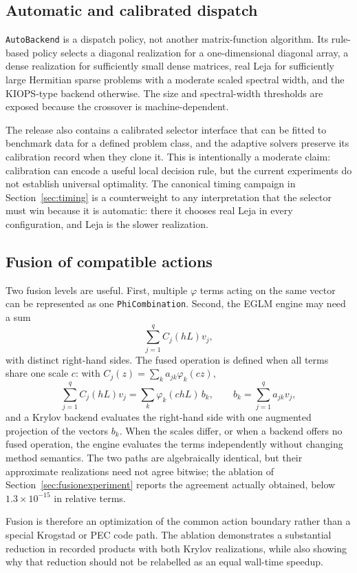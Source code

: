 \subsection{Automatic and calibrated dispatch}

\texttt{AutoBackend} is a dispatch policy, not another matrix-function
algorithm.  Its rule-based policy selects a diagonal realization for a
one-dimensional diagonal array, a dense realization for sufficiently small
dense matrices, real Leja for sufficiently large Hermitian sparse problems with
a moderate scaled spectral width, and the KIOPS-type backend otherwise.  The
size and spectral-width thresholds are exposed because the crossover is
machine-dependent.

The release also contains a calibrated selector interface that can be fitted to
benchmark data for a defined problem class, and the adaptive solvers preserve
its calibration record when they clone it.  This is intentionally a moderate
claim: calibration can encode a useful local decision rule, but the current
experiments do not establish universal optimality.  The canonical timing
campaign in Section~\ref{sec:timing} is a counterweight to any interpretation
that the selector must win because it is automatic: there it chooses real Leja
in every configuration, and Leja is the slower realization.

\subsection{Fusion of compatible actions}\label{sec:fusion}

Two fusion levels are useful.  First, multiple $\varphi$ terms acting on the
same vector can be represented as one \texttt{PhiCombination}.  Second, the
EGLM engine may need a sum
\begin{equation}
  \sum_{j=1}^{q} C_j(hL)v_j,
  \label{eq:distinct-rhs}
\end{equation}
with distinct right-hand sides.  The fused operation is defined when all terms
share one scale $c$: with $C_j(z)=\sum_k a_{jk}\varphi_k(cz)$,
\begin{equation}
  \sum_{j=1}^{q} C_j(hL)v_j=\sum_k \varphi_k(chL)\,b_k,\qquad b_k=\sum_{j=1}^{q} a_{jk}v_j,
  \label{eq:fusion-grouping}
\end{equation}
and a Krylov backend evaluates the right-hand side with one augmented
projection of the vectors $b_k$.  When the scales differ, or when a backend
offers no fused operation, the engine evaluates the terms independently
without changing method semantics.  The two paths are algebraically identical,
but their approximate realizations need not agree bitwise; the ablation of
Section~\ref{sec:fusionexperiment} reports the agreement actually obtained,
below $1.3\times10^{-15}$ in relative terms.

Fusion is therefore an optimization of the common action boundary rather than
a special Krogstad or PEC code path.  The ablation demonstrates a substantial
reduction in recorded products with both Krylov realizations, while also
showing why that reduction should not be relabelled as an equal wall-time
speedup.
